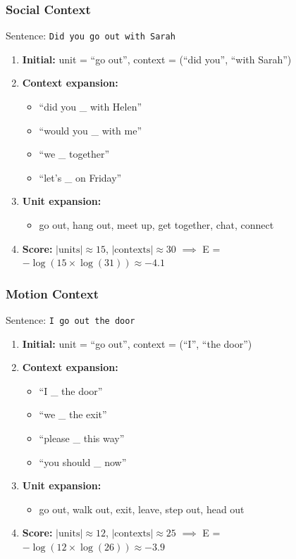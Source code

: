 \documentclass[11pt]{article}
\begin{document}
\subsubsection{Social Context}

Sentence: \texttt{Did you go out with Sarah}

\begin{enumerate}
\item \textbf{Initial:} unit = ``go out'', context = (``did you'', ``with Sarah'')
\item \textbf{Context expansion:}
\begin{itemize}
\item ``did you \_ with Helen''
\item ``would you \_ with me''
\item ``we \_ together''
\item ``let's \_ on Friday''
\end{itemize}
\item \textbf{Unit expansion:}
\begin{itemize}
\item go out, hang out, meet up, get together, chat, connect
\end{itemize}
\item \textbf{Score:} $|\text{units}| \approx 15$, $|\text{contexts}| \approx 30$ $\implies$ E = $-\log(15 \times \log(31)) \approx -4.1$
\end{enumerate}

\subsubsection{Motion Context}

Sentence: \texttt{I go out the door}

\begin{enumerate}
\item \textbf{Initial:} unit = ``go out'', context = (``I'', ``the door'')
\item \textbf{Context expansion:}
\begin{itemize}
\item ``I \_ the door''
\item ``we \_ the exit''
\item ``please \_ this way''
\item ``you should \_ now''
\end{itemize}
\item \textbf{Unit expansion:}
\begin{itemize}
\item go out, walk out, exit, leave, step out, head out
\end{itemize}
\item \textbf{Score:} $|\text{units}| \approx 12$, $|\text{contexts}| \approx 25$ $\implies$ E = $-\log(12 \times \log(26)) \approx -3.9$
\end{enumerate}
\end{document}
